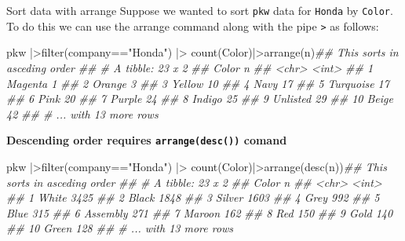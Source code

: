 \documentclass[
  letterpaper,
  DIV=11,
  numbers=noendperiod]{scrartcl}
\newenvironment{Shaded}{\begin{snugshade}}{\end{snugshade}}
\newcommand{\DocumentationTok}[1]{\textcolor[rgb]{0.37,0.37,0.37}{\textit{#1}}}
\newcommand{\FunctionTok}[1]{\textcolor[rgb]{0.28,0.35,0.67}{#1}}
\newcommand{\NormalTok}[1]{\textcolor[rgb]{0.00,0.23,0.31}{#1}}
\newcommand{\SpecialCharTok}[1]{\textcolor[rgb]{0.37,0.37,0.37}{#1}}
\newcommand{\StringTok}[1]{\textcolor[rgb]{0.13,0.47,0.30}{#1}}
\begin{document}
Sort data with arrange Suppose we wanted to sort \texttt{pkw} data for
\texttt{Honda} by \texttt{Color}. To do this we can use the arrange
command along with the pipe \texttt{\textbar{}\textgreater{}} as
follows:

\begin{Shaded}
\begin{Highlighting}[]

\NormalTok{pkw }\SpecialCharTok{|\textgreater{}}\FunctionTok{filter}\NormalTok{(company}\SpecialCharTok{==}\StringTok{"Honda"}\NormalTok{) }\SpecialCharTok{|\textgreater{}} \FunctionTok{count}\NormalTok{(Color)}\SpecialCharTok{|\textgreater{}}\FunctionTok{arrange}\NormalTok{(n)}\DocumentationTok{\#\# This sorts in asceding order}
\DocumentationTok{\#\# \# A tibble: 23 x 2}
\DocumentationTok{\#\#    Color         n}
\DocumentationTok{\#\#    \textless{}chr\textgreater{}     \textless{}int\textgreater{}}
\DocumentationTok{\#\#  1 Magenta       1}
\DocumentationTok{\#\#  2 Orange        3}
\DocumentationTok{\#\#  3 Yellow       10}
\DocumentationTok{\#\#  4 Navy         17}
\DocumentationTok{\#\#  5 Turquoise    17}
\DocumentationTok{\#\#  6 Pink         20}
\DocumentationTok{\#\#  7 Purple       24}
\DocumentationTok{\#\#  8 Indigo       25}
\DocumentationTok{\#\#  9 Unlisted     29}
\DocumentationTok{\#\# 10 Beige        42}
\DocumentationTok{\#\# \# ... with 13 more rows}
\end{Highlighting}
\end{Shaded}

\textbf{Descending order requires \texttt{arrange(desc())} comand}

\begin{Shaded}
\begin{Highlighting}[]
\NormalTok{pkw }\SpecialCharTok{|\textgreater{}}\FunctionTok{filter}\NormalTok{(company}\SpecialCharTok{==}\StringTok{"Honda"}\NormalTok{) }\SpecialCharTok{|\textgreater{}} \FunctionTok{count}\NormalTok{(Color)}\SpecialCharTok{|\textgreater{}}\FunctionTok{arrange}\NormalTok{(}\FunctionTok{desc}\NormalTok{(n))}\DocumentationTok{\#\# This sorts in asceding order}
\DocumentationTok{\#\# \# A tibble: 23 x 2}
\DocumentationTok{\#\#    Color        n}
\DocumentationTok{\#\#    \textless{}chr\textgreater{}    \textless{}int\textgreater{}}
\DocumentationTok{\#\#  1 White     3425}
\DocumentationTok{\#\#  2 Black     1848}
\DocumentationTok{\#\#  3 Silver    1603}
\DocumentationTok{\#\#  4 Grey       992}
\DocumentationTok{\#\#  5 Blue       315}
\DocumentationTok{\#\#  6 Assembly   271}
\DocumentationTok{\#\#  7 Maroon     162}
\DocumentationTok{\#\#  8 Red        150}
\DocumentationTok{\#\#  9 Gold       140}
\DocumentationTok{\#\# 10 Green      128}
\DocumentationTok{\#\# \# ... with 13 more rows}
\end{Highlighting}
\end{Shaded}
\end{document}
